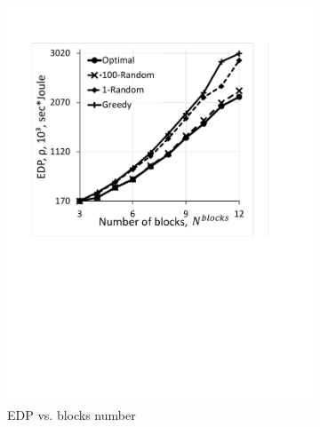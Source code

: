 \begin{figure}
    \centering
    \begin{subfigure}{0.4\textwidth}
        \includegraphics[width=\linewidth]{figs/EDPVsBlocks.pdf}
        \caption{EDP vs. blocks number}
        \label{fig:EDPVsBlocks}
    \end{subfigure}
    \hspace{13mm}
     \begin{subfigure}{0.4\textwidth}

\end{subfigure}
\end{figure}
